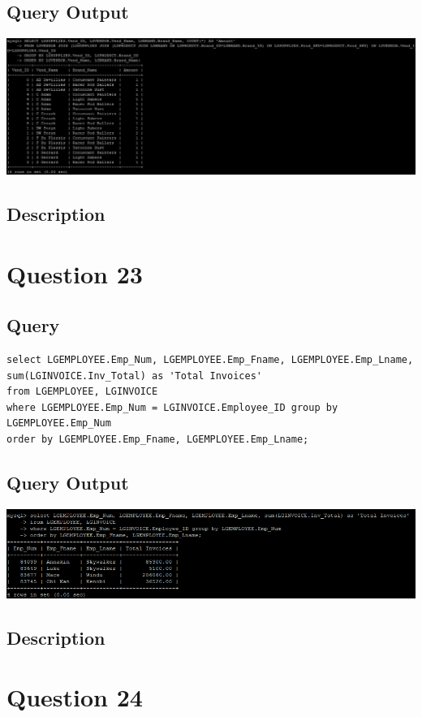 \documentclass[a4paper,10pt]{article}
\begin{document}
\subsection{Query Output}
           \includegraphics{Queries/Question_22/Q22_screenshot.jpg}
\subsection{Description}
\section*{Question 23}
 \subsection{Query}
          \lstset{
            language=SQL,
            breaklines=true
            }
        \begin{lstlisting}[frame=single]
        select LGEMPLOYEE.Emp_Num, LGEMPLOYEE.Emp_Fname, LGEMPLOYEE.Emp_Lname, sum(LGINVOICE.Inv_Total) as 'Total Invoices' 
from LGEMPLOYEE, LGINVOICE 
where LGEMPLOYEE.Emp_Num = LGINVOICE.Employee_ID group by LGEMPLOYEE.Emp_Num 
order by LGEMPLOYEE.Emp_Fname, LGEMPLOYEE.Emp_Lname;
        \end{lstlisting}
\subsection{Query Output}
           \includegraphics{Queries/Question_23/Question_23_screenshot.PNG}
\subsection{Description}
\section*{Question 24}
\end{document}
